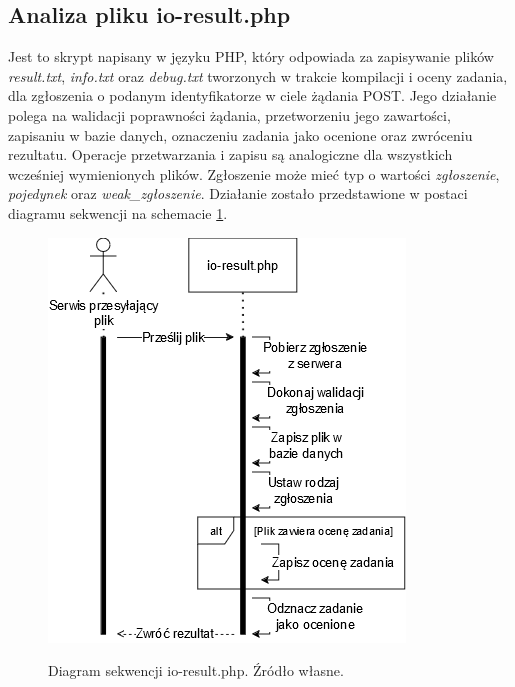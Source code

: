 \subsection{Analiza pliku io-result.php}
Jest to skrypt napisany w języku PHP, który odpowiada za zapisywanie plików \textit{result.txt}, \textit{info.txt} oraz \textit{debug.txt} tworzonych w trakcie kompilacji i oceny zadania, dla zgłoszenia o podanym identyfikatorze w ciele żądania POST. Jego działanie polega na walidacji poprawności żądania, przetworzeniu jego zawartości, zapisaniu w bazie danych, oznaczeniu zadania jako ocenione oraz zwróceniu rezultatu. Operacje przetwarzania i zapisu są analogiczne dla wszystkich wcześniej wymienionych plików. Zgłoszenie może mieć typ o wartości \textit{zgłoszenie}, \textit{pojedynek} oraz \textit{weak\_zgłoszenie}. Działanie zostało przedstawione w postaci diagramu sekwencji na schemacie \ref{io-result}.
\begin{figure}[!h]
	\begin{center}
		\resizebox{0.8\textwidth}{!} {
			\includegraphics{img/2/io-result.png}
		}
		\caption[Diagram sekwencji io-result.php]{Diagram sekwencji io-result.php. Źródło własne.}
		\label{io-result}
	\end{center}
\end{figure}
